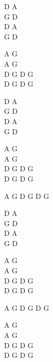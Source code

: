 \begin{chord}
    D A\\
    G D\\
    D A \\
    G D 

    A G\\
    A G \\
    D G D G \\
    D G D G 

    D A\\
    G D\\
    D A \\
    G D 

    A G\\
    A G \\
    D G D G \\
    D G D G 

    A G D G D G

    D A\\
    G D\\
    D A \\
    G D 

    A G\\
    A G \\
    D G D G \\
    D G D G 

    A G D G D G

    A G\\
    A G \\
    D G D G \\
    D G D G 
\end{chord}